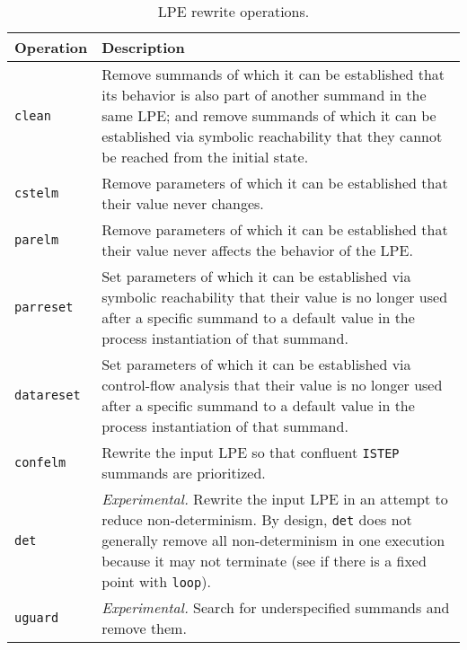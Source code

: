 \begin{table}[!ht]
\begin{center}
\begin{tabularx}{\linewidth}{l|X|}
\textbf{Operation} & \textbf{Description} \\ \hline
\texttt{clean} & Remove summands of which it can be established that its behavior is also part of another summand in the same LPE; and remove summands of which it can be established via symbolic reachability that they cannot be reached from the initial state. \\ \hline
\texttt{cstelm} & Remove parameters of which it can be established that their value never changes. \\ \hline
\texttt{parelm} & Remove parameters of which it can be established that their value never affects the behavior of the LPE. \\ \hline
\texttt{parreset} & Set parameters of which it can be established via symbolic reachability that their value is no longer used after a specific summand to a default value in the process instantiation of that summand. \\ \hline
\texttt{datareset} & Set parameters of which it can be established via control-flow analysis that their value is no longer used after a specific summand to a default value in the process instantiation of that summand. \\ \hline
\texttt{confelm} & Rewrite the input LPE so that confluent \texttt{ISTEP} summands are prioritized. \\ \hline
\texttt{det} & \textit{Experimental.} Rewrite the input LPE in an attempt to reduce non-determinism. By design, \texttt{det} does not generally remove all non-determinism in one execution because it may not terminate (see if there is a fixed point with \texttt{loop}). \\ \hline
\texttt{uguard} & \textit{Experimental.} Search for underspecified summands and remove them. \\ \hline
\end{tabularx}
\caption{LPE rewrite operations.}
\label{lperewriteops:table}
\end{center}
\end{table}

